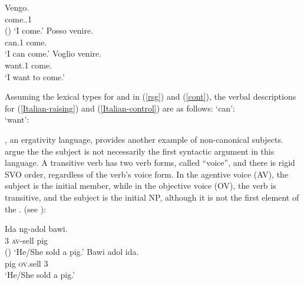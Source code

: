 \eal
\ex 
\label{Italian}
\gll Vengo.\\
     come.\PRS.1\SG\\\hfill()
\glt `I come.'
\ex 
\label{Italian-raising}
\gll Posso venire.\\
     can.1\SG{} come.\INF\\
\glt `I can come.'
\ex 
\label{Italian-control}
\gll Voglio venire.\\ 
     want.1\SG{} come.\INF\\
\glt `I want to come.'
\zl

Assuming the lexical types for  and  in (\ref{rsg}) and
(\ref{cont}), the verbal descriptions for (\ref{Italian-raising}) and (\ref{Italian-control}) are as
follows:
\eal
\ex	
{} `can':\\
\label{rais1}
\ex 
{} `want':\\
\zl


, an ergativity language, provides another example of non-canonical subjects.  \citep{WechslerandArka1998} argue the the subject is not necessarily the first syntactic argument in this language. A transitive verb has two verb forms, called ``voice'', and there is  rigid SVO order,
regardless of the verb's voice form. In the agentive voice (AV), the
subject is the \argst initial member, while in the objective voice (OV), the verb is transitive, and
the subject is the initial NP, although it is not the first element of the \argstl.
   (see
):

\eal
\ex  
\gll Ida ng-adol bawi.\\
     3\SG{} \textsc{av}-sell pig\\ \hfill()
\glt `He/She sold a pig.'
\ex 
\gll Bawi adol ida.\\
     pig \textsc{ov}.sell 3\SG \\
\glt `He/She sold a pig.' 
\zl

